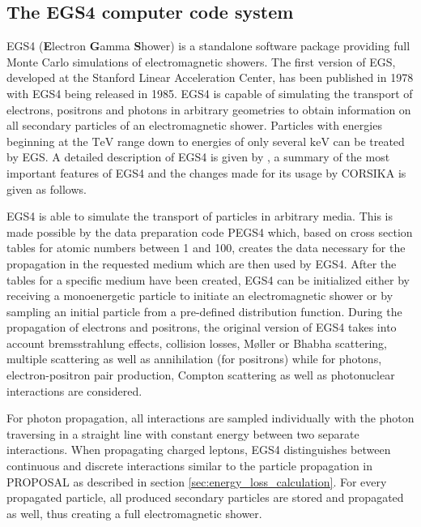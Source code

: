 \subsection{The EGS4 computer code system}
\label{sec:egs4}

EGS4 (\textbf{E}lectron \textbf{G}amma \textbf{S}hower) is a standalone software package providing full Monte Carlo simulations of electromagnetic showers.
The first version of EGS, developed at the Stanford Linear Acceleration Center, has been published in 1978 with EGS4 being released in 1985.
EGS4 is capable of simulating the transport of electrons, positrons and photons in arbitrary geometries to obtain information on all secondary particles of an electromagnetic shower.
Particles with energies beginning at the $\si{\tera\electronvolt}$ range down to energies of only several $\si{\kilo\electronvolt}$ can be treated by EGS.
A detailed description of EGS4 is given by \cite{egs4}, a summary of the most important features of EGS4 and the changes made for its usage by CORSIKA is given as follows.

EGS4 is able to simulate the transport of particles in arbitrary media.
This is made possible by the data preparation code PEGS4 which, based on cross section tables for atomic numbers between 1 and 100, creates the data necessary for the propagation in the requested medium which are then used by EGS4.
After the tables for a specific medium have been created, EGS4 can be initialized either by receiving a monoenergetic particle to initiate an electromagnetic shower or by sampling an initial particle from a pre-defined distribution function.
During the propagation of electrons and positrons, the original version of EGS4 takes into account bremsstrahlung effects, collision losses, M{\o}ller or Bhabha scattering, multiple scattering as well as annihilation (for positrons) while for photons, electron-positron pair production, Compton scattering as well as photonuclear interactions are considered.

For photon propagation, all interactions are sampled individually with the photon traversing in a straight line with constant energy between two separate interactions.
When propagating charged leptons, EGS4 distinguishes between continuous and discrete interactions similar to the particle propagation in PROPOSAL as described in section \ref{sec:energy_loss_calculation}.
For every propagated particle, all produced secondary particles are stored and propagated as well, thus creating a full electromagnetic shower.


